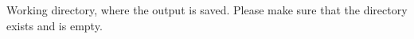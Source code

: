 Working directory, where the output is saved. Please make sure that the directory exists and is empty. 
